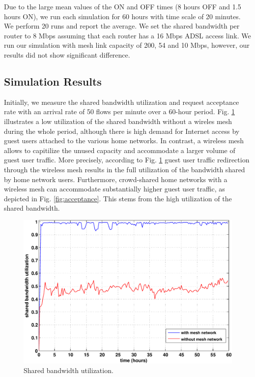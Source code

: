 Due to the large mean values of the ON and OFF times (8 hours OFF and 1.5 hours ON), we run each simulation for 60 hours with time scale of 20 minutes. We perform 20 runs and report the average. We set the shared bandwidth per router to 8 Mbps assuming that each router has a 16 Mbps ADSL access link. We run our simulation with mesh link capacity of 200, 54 and 10 Mbps, however, our results did not show significant difference. 

\subsection{Simulation Results}
\label{evaluation:results}

Initially, we measure the shared bandwidth utilization and request acceptance rate with an arrival rate of 50 flows per minute over a 60-hour period. Fig. \ref{fig:utilization} illustrates a low utilization of the shared bandwidth without a wireles mesh during the whole period, although there is high demand for Internet access by guest users attached to the various home networks. In contrast, a wireless mesh allows to capitilize the unused capacity and accommodate a larger volume of guest user traffic. More precisely, according to Fig. \ref{fig:utilization} guest user traffic redirection through the wireless mesh results in the full utilization of the bandwidth shared by home network users. Furthermore, crowd-shared home networks with a wireless mesh can accommodate substantially higher guest user traffic, as depicted in Fig. \ref{fig:acceptance}. This stems from the high utilization of the shared bandwidth.

\begin{figure}[t]
\begin{center}
\includegraphics[width=1\linewidth]{results/utilization.pdf}
\caption{Shared bandwidth utilization.}
\label{fig:utilization}
\end{center}
\end{figure}

